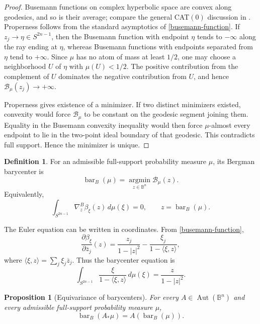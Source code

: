 \documentclass[11pt]{article}
\newtheorem{proposition}[theorem]{Proposition}
\theoremstyle{definition}
\newtheorem{definition}[theorem]{Definition}
\theoremstyle{remark}
\theoremstyle{definition}
\newcommand{\B}{\mathbb B}
\newcommand{\Aut}{\operatorname{Aut}}
\newcommand{\barB}{\operatorname{bar}_{B}}
\begin{document}
\begin{proof}
Busemann functions on complex hyperbolic space are convex along geodesics, and
so is their average; compare the general CAT\((0)\) discussion in
\cite{BH}.  Properness follows from the standard asymptotics of
\eqref{busemann-function}.  If \(z_j\to\eta\in S^{2n-1}\), then the Busemann
function with endpoint \(\eta\) tends to \(-\infty\) along the ray ending at
\(\eta\), whereas Busemann functions with endpoints separated from \(\eta\) tend
to \(+\infty\).  Since \(\mu\) has no atom of mass at least \(1/2\), one may
choose a neighborhood \(U\) of \(\eta\) with \(\mu(U)<1/2\).  The positive
contribution from the complement of \(U\) dominates the negative contribution
from \(U\), and hence \(\mathcal B_\mu(z_j)\to+\infty\).

Properness gives existence of a minimizer.  If two distinct minimizers existed,
convexity would force \(\mathcal B_\mu\) to be constant on the geodesic segment
joining them.  Equality in the Busemann convexity inequality would then force
\(\mu\)-almost every endpoint to lie in the two-point ideal boundary of that
geodesic.  This contradicts full support.  Hence the minimizer is unique.
\end{proof}

\begin{definition}
For an admissible full-support probability measure \(\mu\), its Bergman
barycenter is
\begin{equation}\label{definition-bar}
        \barB(\mu)=\operatorname*{argmin}_{z\in\B^n}\mathcal B_\mu(z).
\end{equation}
Equivalently,
\begin{equation}\label{gradient-equation}
        \int_{S^{2n-1}}\nabla_z^B\beta_\xi(z)\,d\mu(\xi)=0,
        \qquad z=\barB(\mu).
\end{equation}
\end{definition}

The Euler equation can be written in coordinates.  From
\eqref{busemann-function},
\[
        \frac{\partial\beta_\xi}{\partial\overline z_j}(z)
        =
        \frac{z_j}{1-|z|^2}-\frac{\xi_j}{1-\langle \xi,z\rangle},
\]
where \(\langle \xi,z\rangle=\sum_j\xi_j\overline z_j\).  Thus the barycenter
equation is
\begin{equation}\label{coordinate-barycenter-equation}
        \int_{S^{2n-1}}
        \frac{\xi}{1-\langle \xi,z\rangle}\,d\mu(\xi)
        =
        \frac{z}{1-|z|^2}.
\end{equation}
\begin{proposition}[Equivariance of barycenters]\label{equivariance-barycenter}
For every \(A\in\Aut(\B^n)\) and every admissible full-support probability
measure \(\mu\),
\begin{equation}\label{bar-equivariance}
        \barB(A_*\mu)=A(\barB(\mu)).
\end{equation}
\end{proposition}
\end{document}
